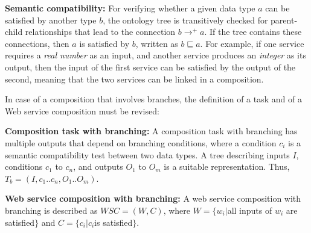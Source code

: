 \textbf{Semantic compatibility:} For verifying whether a given data type $a$ can be satisfied by another type $b$, the ontology tree is transitively checked for parent-child relationships that lead to the connection $b \rightarrow^+ a$. If the tree contains these connections, then $a$ is satisfied by $b$, written as $b \sqsubseteq a$. For example, if one service requires a \textit{real number} as an input, and another service produces an \textit{integer} as its output, then the input of the first service can be satisfied by the output of the second, meaning that the two services can be linked in a composition.

In case of a composition that involves branches, the definition of a task and of a Web service composition must be revised:

\textbf{Composition task with branching:} A composition task with branching has multiple outputs that depend on branching conditions, where a condition $c_i$ is a semantic compatibility test between two data types. A tree describing inputs $I$, conditions $c_1$ to $c_n$, and outputs $O_1$ to $O_m$ is a suitable representation. Thus, $T_b = (I,c_1..c_n, O_1..O_m)$.

\textbf{Web service composition with branching:} A web service composition with branching is described as $WSC = (W, C)$, where $W = \{w_i | $all inputs of $w_i$ are satisfied$\}$ and $C = \{c_i | c_i $is satisfied$\}$.
